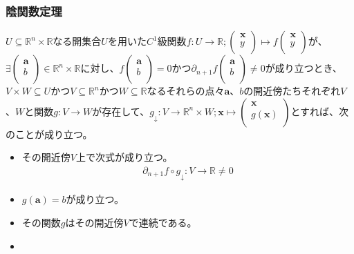 \documentclass[dvipdfmx]{jsarticle}
\begin{document}
\subsubsection{陰関数定理}%
\begin{thm}[陰関数定理]\label{4.4.1.1}
$U \subseteq \mathbb{R}^{n} \times \mathbb{R}$なる開集合$U$を用いた$C^{1}$級関数$f:U \rightarrow \mathbb{R};\begin{pmatrix}
\mathbf{x} \\
y \\
\end{pmatrix} \mapsto f\begin{pmatrix}
\mathbf{x} \\
y \\
\end{pmatrix}$が、$\exists\begin{pmatrix}
\mathbf{a} \\
b \\
\end{pmatrix} \in \mathbb{R}^{n} \times \mathbb{R}$に対し、$f\begin{pmatrix}
\mathbf{a} \\
b \\
\end{pmatrix} = 0$かつ$\partial_{n + 1}f\begin{pmatrix}
\mathbf{a} \\
b \\
\end{pmatrix} \neq 0$が成り立つとき、$V \times W \subseteq U$かつ$V \subseteq \mathbb{R}^{n}$かつ$W \subseteq \mathbb{R}$なるそれらの点々$\mathbf{a}$、$b$の開近傍たちそれぞれ$V$、$W$と関数$g:V \rightarrow W$が存在して、$g_{\downarrow}:V \rightarrow \mathbb{R}^{n} \times W;\mathbf{x} \mapsto \begin{pmatrix}
\mathbf{x} \\
g\left( \mathbf{x} \right) \\
\end{pmatrix}$とすれば、次のことが成り立つ。
\begin{itemize}
\item
  その開近傍$V$上で次式が成り立つ。
\begin{align*}
\partial_{n + 1}f \circ g_{\downarrow}:V \rightarrow \mathbb{R} \neq 0
\end{align*}
\item
  $g\left( \mathbf{a} \right) = b$が成り立つ。
\item
  その関数$g$はその開近傍$V$で連続である。
\item

\end{itemize}
\end{thm}
\end{document}
